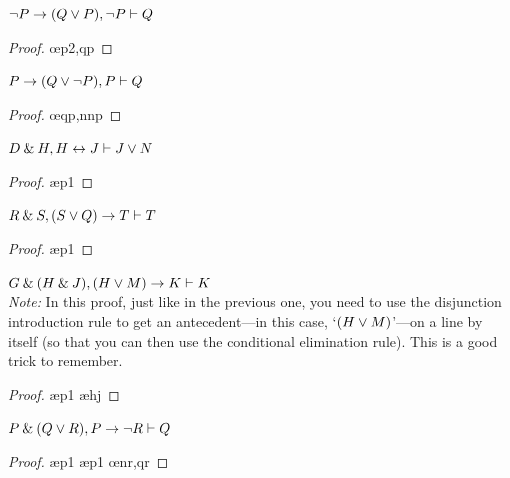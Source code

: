 \problempart
\begin{earg}
\item ${\neg} P \rightarrow (Q \vee P), {\neg} P \vdash Q$
\begin{proof}
	 \pr{}
	 \pr{}
	 
	 \oe{p2,qp}
\end{proof}
\medskip

\item $P \rightarrow (Q \vee {\neg} P), P \vdash Q$\\
\begin{proof}
	 \pr{}
	 \pr{}
	 
	  
	 \oe{qp,nnp}
\end{proof}
\medskip


\item $D \mathbin{\&} H, H \leftrightarrow J  \vdash J \vee N$ 
\begin{proof}
	 \pr{}
	 \pr{}
	 \ae{p1}
	 
	 
\end{proof}
\medskip

\filbreak

\item $R \mathbin{\&} S, (S \vee Q) \rightarrow T \vdash T$
\begin{proof}
	 \pr{}
	 \pr{}
	 \ae{p1}
	 
	 
\end{proof}
\medskip

\item $G \mathbin{\&} (H \mathbin{\&} J), (H \vee M) \rightarrow K \vdash K$\\
\textit{Note:} In this proof, just like in the previous one, you need to use the disjunction introduction rule to get an antecedent---in this case, `$(H \vee M)$'---on a line by itself (so that you can then use the conditional elimination rule). This is a good trick to remember. 
\begin{proof}
	 \pr{}
	 \pr{}
	 \ae{p1}
	 \ae{hj}
	 
	 
\end{proof}
\medskip


\item $P \mathbin{\&} (Q \vee R), P \rightarrow {\neg} R \vdash Q$
\begin{proof}
	 \pr{}
	 \pr{}
	 \ae{p1}
	 
	 \ae{p1}
	 \oe{nr,qr}
\end{proof}
\medskip



\end{earg}
